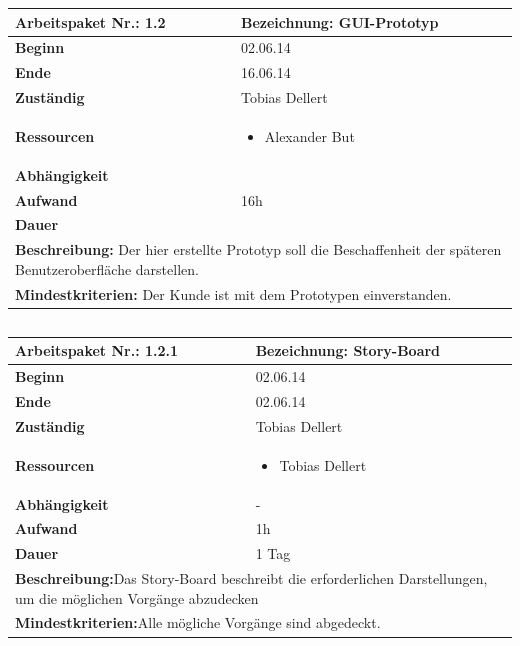 \documentclass[fontsize=12pt,paper=a4,twoside]{scrartcl}
\begin{document}
\begin{verbatim} 
\end{verbatim}

\begin{tabular}{|p{5.3cm}|p{9.7cm}|}\hline
	\textbf{Arbeitspaket Nr.:} 1.2 & \textbf{Bezeichnung:} GUI-Prototyp\\ \hline \hline
	\textbf{Beginn} & 02.06.14\\ \hline
	\textbf{Ende} & 16.06.14\\ \hline
	\textbf{Zuständig} & Tobias Dellert\\ \hline
	\textbf{Ressourcen} & \begin{itemize}
		\item Alexander But
	\end{itemize}    \\ \hline
	\textbf{Abhängigkeit} &\\ \hline
	\textbf{Aufwand} & 16h\\ \hline
	\textbf{Dauer} & \\ \hline
	\multicolumn{2}{|p{15cm}|}{\textbf{Beschreibung:} Der hier erstellte Prototyp soll die Beschaffenheit der späteren Benutzeroberfläche darstellen. \newline   }\\ \hline
	\multicolumn{2}{|p{15cm}|}{\textbf{Mindestkriterien:} Der Kunde ist mit dem Prototypen einverstanden.\newline }\\ \hline
\end{tabular}

\begin{verbatim} 
\end{verbatim}

\begin{tabular}{|p{5.3cm}|p{9.7cm}|}\hline
	\textbf{Arbeitspaket Nr.:} 1.2.1 & \textbf{Bezeichnung:} Story-Board\\ \hline \hline
	\textbf{Beginn} & 02.06.14\\ \hline
	\textbf{Ende} & 02.06.14\\ \hline
	\textbf{Zuständig} & Tobias Dellert\\ \hline
	\textbf{Ressourcen} & \begin{itemize}
		\item Tobias Dellert
	\end{itemize}    \\ \hline
	\textbf{Abhängigkeit} & -\\ \hline
	\textbf{Aufwand} & 1h\\ \hline
	\textbf{Dauer} & 1 Tag\\ \hline
	\multicolumn{2}{|p{15cm}|}{\textbf{Beschreibung:}\newline  Das Story-Board beschreibt die erforderlichen Darstellungen, um die möglichen Vorgänge abzudecken }\\ \hline
	\multicolumn{2}{|p{15cm}|}{\textbf{Mindestkriterien:}\newline Alle mögliche Vorgänge sind abgedeckt. }\\ \hline
\end{tabular}
\end{document}
